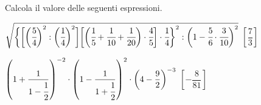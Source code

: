 \begin{esercizio}[\Ast]
\label{ese:3.158}
 Calcola il valore delle seguenti espressioni.
\begin{enumeratea}
\spazielenx
\item \(\displaystyle{\sqrt{\bigg\{\bigg[\bigg(\cfrac{5}{4}\bigg)^{2}:
\bigg(\cfrac{1}{4}\bigg)^{2}\bigg]%
\bigg[\bigg(\cfrac{1}{5}+\cfrac{1}{10}+\cfrac{1}{20}\bigg)\cdot\cfrac{4}{5}
\bigg]\cdot\cfrac{1}{4}\bigg\}^{2}%
:\bigg(1-\cfrac{5}{6}\cdot\cfrac{3}{10}\bigg)^{2}}}\)
  \hfill \(\left[\dfrac{7}{3} \right]\)
\item \(\displaystyle{\left(1+\frac{1}{1-\cfrac{1}{2}}\right)^{-2}\cdot
\left(1-\frac{1}{1+\cfrac{1}{2}}\right)^{2}\cdot%
\bigg(4-\frac{9}{2}\bigg)^{-3}}\)
  \hfill \(\left[-\dfrac{8}{81} \right]\)
\end{enumeratea}
\end{esercizio}

